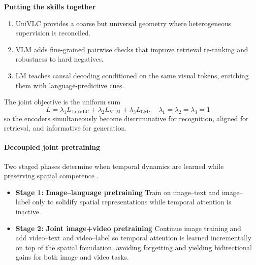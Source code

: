 \begin{enrichment}
\begin{enrichment}
        \noindent\textbf{Putting the skills together}
        \begin{enumerate}
            \item UniVLC provides a coarse but universal geometry where heterogeneous supervision is reconciled.
            \item VLM adds fine-grained pairwise checks that improve retrieval re-ranking and robustness to hard negatives.
            \item LM teaches causal decoding conditioned on the same visual tokens, enriching them with language-predictive cues.
        \end{enumerate}
        The joint objective is the uniform sum
        \[
        L=\lambda_1 L_{\mathrm{UniVLC}}+\lambda_2 L_{\mathrm{VLM}}+\lambda_3 L_{\mathrm{LM}},\quad \lambda_1=\lambda_2=\lambda_3=1
        \tag{5}
        \]
        so the encoders simultaneously become discriminative for recognition, aligned for retrieval, and informative for generation.
        
        \paragraph{Decoupled joint pretraining}
        Two staged phases determine when temporal dynamics are learned while preserving spatial competence \cite{wang2022_omnivl}.
        \begin{itemize}
            \item \textbf{Stage 1: Image–language pretraining} Train on image–text and image–label only to solidify spatial representations while temporal attention is inactive.
            \item \textbf{Stage 2: Joint image+video pretraining} Continue image training and add video–text and video–label so temporal attention is learned incrementally on top of the spatial foundation, avoiding forgetting and yielding bidirectional gains for both image and video tasks.
        \end{itemize}
        

\end{enrichment}
\end{enrichment}
